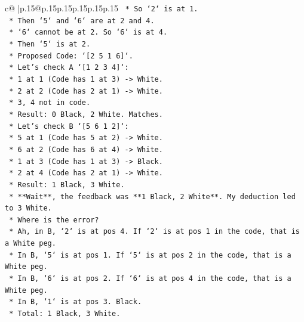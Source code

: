 \documentclass{article}
\begin{document}
{\begin{supertabular}{c@{$\;$}|p{.15\linewidth}@{}p{.15\linewidth}p{.15\linewidth}p{.15\linewidth}p{.15\linewidth}p{.15\linewidth}}
{{{\texttt{                *   So `2` is at 1.} \\
\texttt{                *   Then `5` and `6` are at 2 and 4.} \\
\texttt{                *   `6` cannot be at 2. So `6` is at 4.} \\
\texttt{                *   Then `5` is at 2.} \\
\texttt{                *   Proposed Code: `{[}2 5 1 6{]}`.} \\
\texttt{                *   Let's check A `{[}1 2 3 4{]}`:} \\
\texttt{                    *   1 at 1 (Code has 1 at 3) {-}> White.} \\
\texttt{                    *   2 at 2 (Code has 2 at 1) {-}> White.} \\
\texttt{                    *   3, 4 not in code.} \\
\texttt{                    *   Result: 0 Black, 2 White. Matches.} \\
\texttt{                *   Let's check B `{[}5 6 1 2{]}`:} \\
\texttt{                    *   5 at 1 (Code has 5 at 2) {-}> White.} \\
\texttt{                    *   6 at 2 (Code has 6 at 4) {-}> White.} \\
\texttt{                    *   1 at 3 (Code has 1 at 3) {-}> Black.} \\
\texttt{                    *   2 at 4 (Code has 2 at 1) {-}> White.} \\
\texttt{                    *   Result: 1 Black, 3 White.} \\
\texttt{                    *   **Wait**, the feedback was **1 Black, 2 White**. My deduction led to 3 White.} \\
\texttt{                    *   Where is the error?} \\
\texttt{                    *   Ah, in B, `2` is at pos 4. If `2` is at pos 1 in the code, that is a White peg.} \\
\texttt{                    *   In B, `5` is at pos 1. If `5` is at pos 2 in the code, that is a White peg.} \\
\texttt{                    *   In B, `6` is at pos 2. If `6` is at pos 4 in the code, that is a White peg.} \\
\texttt{                    *   In B, `1` is at pos 3. Black.} \\
\texttt{                    *   Total: 1 Black, 3 White.} \\
}}}
\end{supertabular}}
\end{document}
